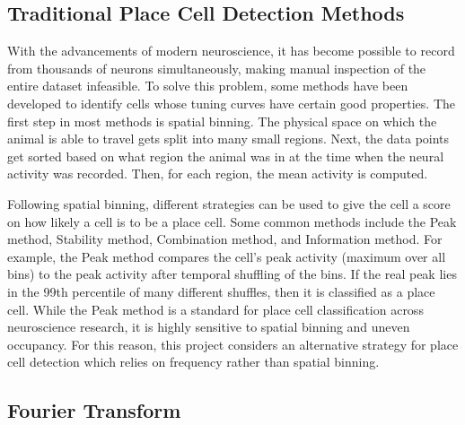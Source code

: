 \documentclass[preprint]{aastex701}
\begin{document}
\subsection{Traditional Place Cell Detection Methods}
With the advancements of modern neuroscience, it has become possible to record from thousands of neurons simultaneously, making manual inspection of the entire dataset infeasible. To solve this problem, some methods have been developed to identify cells whose tuning curves have certain good properties. The first step in most methods is spatial binning. The physical space on which the animal is able to travel gets split into many small regions. Next, the data points get sorted based on what region the animal was in at the time when the neural activity was recorded. Then, for each region, the mean activity is computed. 

Following spatial binning, different strategies can be used to give the cell a score on how likely a cell is to be a place cell. Some common methods include the Peak method, \citep{fournier2020distance} Stability method, \citep{oleary2019stability} Combination method, \citep{dombeck2010imaging} and Information method. \citep{ziv2013longterm} For example, the Peak method compares the cell's peak activity (maximum over all bins) to the peak activity after temporal shuffling of the bins. If the real peak lies in the 99th percentile of many different shuffles, then it is classified as a place cell. While the Peak method is a standard for place cell classification across neuroscience research, \citep{grijseels2021choice} it is highly sensitive to spatial binning and uneven occupancy. \citep{Grieves2023RateMapQuant} For this reason, this project considers an alternative strategy for place cell detection which relies on frequency rather than spatial binning.

\subsection{Fourier Transform}
\end{document}
